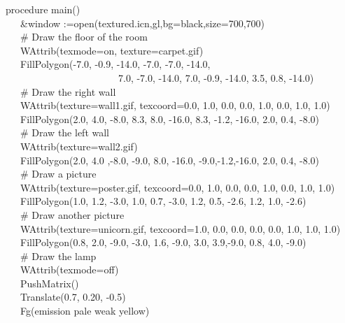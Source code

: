 \documentclass[letterpaper]{article}
\begin{document}
{{\sffamily
procedure main() \\
\ \ \ \&window
:=open({\textquotedbl}textured.icn{\textquotedbl},{\textquotedbl}gl{\textquotedbl},{\textquotedbl}bg=black{\textquotedbl},{\textquotedbl}size=700,700{\textquotedbl}) \\
\ \ \ \# Draw the floor of the room \\
\ \ \ WAttrib({\textquotedbl}texmode=on{\textquotedbl}, {\textquotedbl}texture=carpet.gif{\textquotedbl})  \\
\ \ \ FillPolygon(-7.0, -0.9, -14.0, -7.0, -7.0, -14.0,\\
\ \ \ \ \ \ \ \ \ \ \ \ \ \ \ \ \ \ \ \ \ \ \ 7.0, -7.0, -14.0, 7.0, -0.9, -14.0, 3.5, 0.8, -14.0)\\
\ \ \ \# Draw the right wall\\
\ \ \ WAttrib({\textquotedbl}texture=wall1.gif{\textquotedbl}, {\textquotedbl}texcoord=0.0, 1.0, 0.0, 0.0, 1.0, 0.0, 1.0, 1.0{\textquotedbl}) \\
\ \ \ FillPolygon(2.0, 4.0, -8.0, 8.3, 8.0, -16.0, 8.3, -1.2, -16.0, 2.0, 0.4, -8.0)\\
\ \ \ \# Draw the left wall\\
\ \ \ WAttrib({\textquotedbl}texture=wall2.gif{\textquotedbl})\\
\ \ \ FillPolygon(2.0, 4.0 ,-8.0, -9.0, 8.0, -16.0, -9.0,-1.2,-16.0, 2.0, 0.4, -8.0)\\
\ \ \ \# Draw a picture\\
\ \ \ WAttrib({\textquotedbl}texture=poster.gif{\textquotedbl}, {\textquotedbl}texcoord=0.0, 1.0, 0.0, 0.0, 1.0, 0.0, 1.0, 1.0{\textquotedbl})\\
\ \ \ FillPolygon(1.0, 1.2, -3.0, 1.0, 0.7, -3.0, 1.2, 0.5, -2.6, 1.2, 1.0, -2.6)\\
\ \ \ \# Draw another picture\\
\ \ \ WAttrib({\textquotedbl}texture=unicorn.gif{\textquotedbl}, {\textquotedbl}texcoord=1.0, 0.0, 0.0, 0.0, 0.0, 1.0, 1.0, 1.0{\textquotedbl})\\
\ \ \ FillPolygon(0.8, 2.0, -9.0, -3.0, 1.6, -9.0, 3.0, 3.9,-9.0, 0.8, 4.0, -9.0)\\
\ \ \ \# Draw the lamp\\
\ \ \ WAttrib({\textquotedbl}texmode=off{\textquotedbl})\\
\ \ \ PushMatrix()\\
\ \ \ Translate(0.7, 0.20, -0.5)\\
\ \ \ Fg({\textquotedbl}emission pale weak yellow{\textquotedbl})\\
}}
\end{document}
